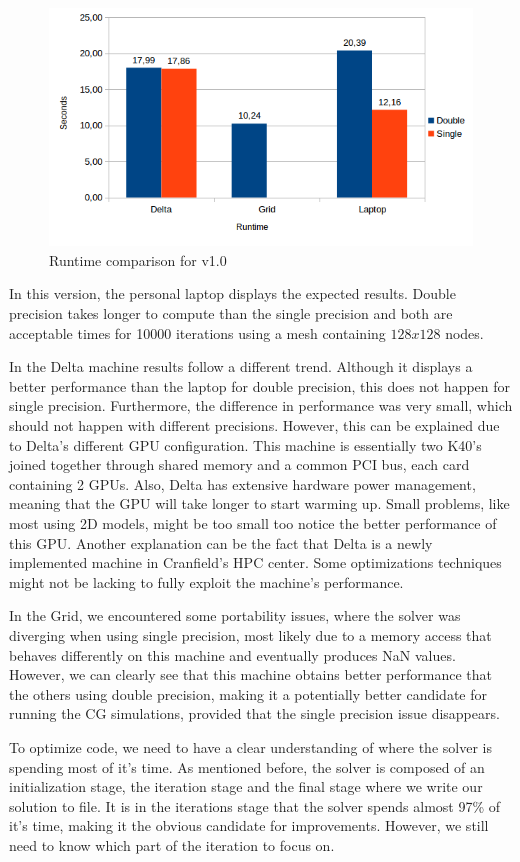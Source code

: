 \documentclass[12pt, openany]{book}
\begin{document}
  \begin{figure}[H]
  	\centering
  	\includegraphics[width=\linewidth]{Resources/Images/v1.png}
  	\caption{Runtime comparison for v1.0}
  	\label{fig:v1}
  \end{figure}
  
  In this version, the personal laptop displays the expected results. Double precision takes longer to compute than the single precision and both are acceptable times for 10000 iterations using a mesh containing $128x128$ nodes. \par
  In the Delta machine results follow a different trend. Although it displays a better performance than the laptop for double precision, this does not happen for single precision. Furthermore, the difference in performance was very small, which should not happen with different precisions. However, this can be explained due to Delta's different GPU configuration. This machine is essentially two K40's joined together through shared memory and a common PCI bus, each card containing 2 GPUs. Also, Delta has extensive hardware power management, meaning that the GPU will take longer to start warming up. Small problems, like most using 2D models, might be too small too notice the better performance of this GPU. Another explanation can be the fact that Delta is a newly implemented machine in Cranfield's HPC center. Some optimizations techniques might not be lacking to fully exploit the machine's performance.\par
  In the Grid, we encountered some portability issues, where the solver was diverging when using single precision, most likely due to a memory access that behaves differently on this machine and eventually produces NaN values. However, we can clearly see that this machine obtains better performance that the others using double precision, making it a potentially better candidate for running the CG simulations, provided that the single precision issue disappears.\par
  To optimize code, we need to have a clear understanding of where the solver is spending most of it's time. As mentioned before, the solver is composed of an initialization stage, the iteration stage and the final stage where we write our solution to file. It is in the iterations stage that the solver spends almost 97\% of it's time, making it the obvious candidate for improvements. However, we still need to know which part of the iteration to focus on. 
  
\end{document}
